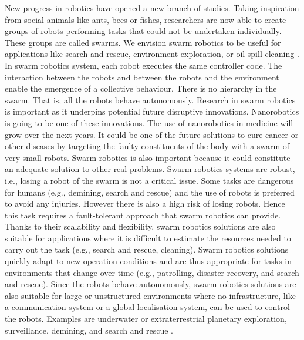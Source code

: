 \documentclass[oneside, a4paper, 12pt]{memoir}
\begin{document}
	New progress in robotics have opened a new branch of studies. Taking inspiration from social animals like ants, bees or fishes, researchers are now able to create groups of robots performing tasks that could not be undertaken individually. These groups are called swarms. We envision swarm robotics to be useful for applications like search and rescue, environment exploration, or oil spill cleaning \citep{Dorigo:2014}. In swarm robotics system, each robot executes the same controller code. The interaction between the robots and between the robots and the environment enable the emergence of a collective behaviour. There is no hierarchy in the swarm. That is, all the robots behave autonomously. Research in swarm robotics is important as it underpins potential future disruptive innovations. Nanorobotics is going to be one of these innovations. The use of nanorobotics in medicine will grow over the next years. It could be one of the future solutions to cure cancer or other diseases by targeting the faulty constituents of the body with a swarm of very small robots. Swarm robotics is also important because it could constitute an adequate solution to other real problems. Swarm robotics systems are robust, i.e., losing a robot of the swarm is not a critical issue. Some tasks are dangerous for humans (e.g., demining, search and rescue) and the use of robots is preferred to avoid any injuries. However there is also a high risk of losing robots. Hence this task requires a fault-tolerant approach that swarm robotics can provide. Thanks to their scalability and flexibility, swarm robotics solutions are also suitable for applications where it is difficult to estimate the resources needed to carry out the task (e.g., search and rescue, cleaning). Swarm robotics solutions quickly adapt to new operation conditions and are thus appropriate for tasks in environments that change over time (e.g., patrolling, disaster recovery, and search and rescue). Since the robots behave autonomously, swarm robotics solutions are also suitable for large or unstructured environments where no infrastructure, like a communication system or a global localisation system, can be used to control the robots. Examples are underwater or extraterrestrial planetary exploration, surveillance, demining, and search and rescue \citep{Dorigo:2014}.
	
\end{document}
